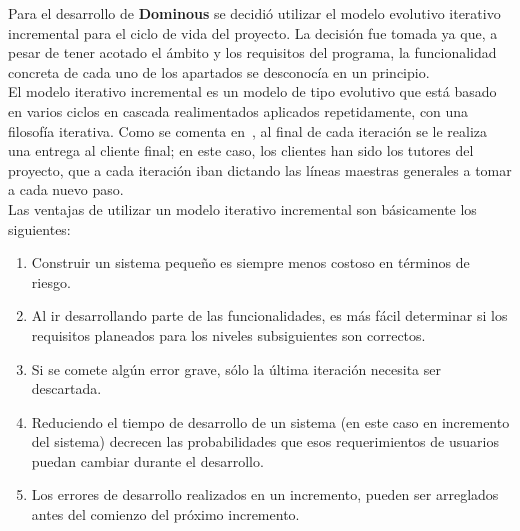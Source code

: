 

Para el desarrollo de \textbf{Dominous} se decidió utilizar el modelo evolutivo iterativo incremental para el ciclo de
vida del proyecto. La decisión fue tomada ya que, a pesar de tener acotado el ámbito y los requisitos del programa,
la funcionalidad concreta de cada uno de los apartados se desconocía en un principio.\\

El modelo iterativo incremental es un modelo de tipo evolutivo que está basado en varios ciclos en cascada realimentados aplicados
repetidamente, con una filosofía iterativa. Como se comenta en~\cite{ingenieriaIan}, al final de cada iteración se le
realiza una entrega al cliente final; en este caso, los clientes han sido los tutores del proyecto, que a cada iteración iban
dictando las líneas maestras generales a tomar a cada nuevo paso.\\

Las ventajas de utilizar un modelo iterativo incremental son básicamente los siguientes:
\begin{enumerate}
    \item Construir un sistema pequeño es siempre menos costoso en términos de riesgo.
    \item Al ir desarrollando parte de las funcionalidades, es más fácil determinar si los requisitos
            planeados para los niveles subsiguientes son correctos.
    \item Si se comete algún error grave, sólo la última iteración necesita ser descartada.
    \item Reduciendo el tiempo de desarrollo de un sistema (en este caso en incremento del sistema) decrecen las
            probabilidades que esos requerimientos de usuarios puedan cambiar durante el desarrollo.
    \item Los errores de desarrollo realizados en un incremento, pueden ser arreglados antes del comienzo del próximo incremento.
\end{enumerate}


